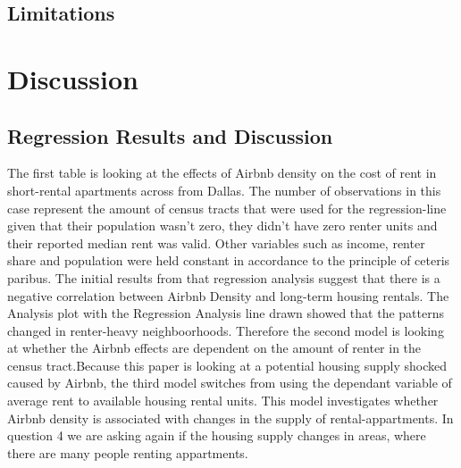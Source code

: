 \documentclass[Department of Economics]{AEA}
\begin{document}
\subsection{Limitations}\label{limitations}

\section{Discussion}\label{discussion}

\subsection{Regression Results and
Discussion}\label{regression-results-and-discussion}

The first table is looking at the effects of Airbnb density on the cost
of rent in short-rental apartments across from Dallas. The number of
observations in this case represent the amount of census tracts that
were used for the regression-line given that their population wasn't
zero, they didn't have zero renter units and their reported median rent
was valid. Other variables such as income, renter share and population
were held constant in accordance to the principle of ceteris paribus.
The initial results from that regression analysis suggest that there is
a negative correlation between Airbnb Density and long-term housing
rentals. The Analysis plot with the Regression Analysis line drawn
showed that the patterns changed in renter-heavy neighboorhoods.
Therefore the second model is looking at whether the Airbnb effects are
dependent on the amount of renter in the census tract.Because this paper
is looking at a potential housing supply shocked caused by Airbnb, the
third model switches from using the dependant variable of average rent
to available housing rental units. This model investigates whether
Airbnb density is associated with changes in the supply of
rental-appartments. In question 4 we are asking again if the housing
supply changes in areas, where there are many people renting
appartments. \begingroup \centering
\end{document}
